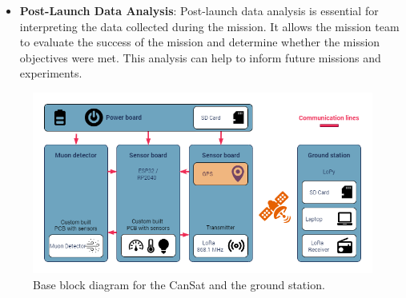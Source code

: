 \begin{itemize}[leftmargin=1.27cm, itemindent=0cm, topsep=2pt, label=\faTasks]
    \item[\faChartBar] \textbf{Post-Launch Data Analysis}: Post-launch data analysis is essential for interpreting the data collected during the mission. It allows the mission team to evaluate the success of the mission and determine whether the mission objectives were met. This analysis can help to inform future missions and experiments. 
\end{itemize}

%  

\begin{figure}[htbp]
\centering
\includegraphics[width=0.9\linewidth]{images/RCRC_2024Block.drawio.png}
\caption{\small{Base block diagram for the CanSat and the ground station.}}
\label{fig:bloc_diagrame}
\end{figure}

